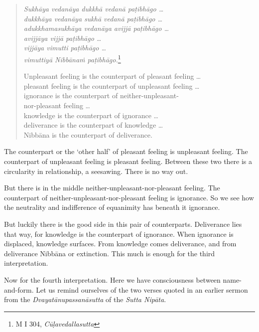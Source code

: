 \begin{quote}
\emph{Sukhāya vedanāya dukkhā vedanā paṭibhāgo \ldots{}}\\
\emph{dukkhāya vedanāya sukhā vedanā paṭibhāgo \ldots{}}\\
\emph{adukkhamasukhāya vedanāya avijjā paṭibhāgo \ldots{}}\\
\emph{avijjāya vijjā paṭibhāgo \ldots{}}\\
\emph{vijjāya vimutti paṭibhāgo \ldots{}}\\
\emph{vimuttiyā Nibbānaṁ paṭibhāgo.}\footnote{M I 304, \emph{Cūḷavedallasutta}}

Unpleasant feeling is the counterpart of pleasant feeling \ldots{}\\
pleasant feeling is the counterpart of unpleasant feeling \ldots{}\\
ignorance is the counterpart of neither-unpleasant-\\ nor-pleasant feeling \ldots{}\\
knowledge is the counterpart of ignorance \ldots{}\\
deliverance is the counterpart of knowledge \ldots{}\\
Nibbāna is the counterpart of deliverance.
\end{quote}

The counterpart or the `other half' of pleasant feeling is unpleasant feeling. The counterpart of unpleasant feeling is pleasant feeling. Between these two there is a circularity in relationship, a seesawing. There is no way out.

But there is in the middle neither-unpleasant-nor-pleasant feeling. The counterpart of neither-unpleasant-nor-pleasant feeling is ignorance. So we see how the neutrality and indifference of equanimity has beneath it ignorance.

But luckily there is the good side in this pair of counterparts. Deliverance lies that way, for knowledge is the counterpart of ignorance. When ignorance is displaced, knowledge surfaces. From knowledge comes deliverance, and from deliverance Nibbāna or extinction. This much is enough for the third interpretation.

Now for the fourth interpretation. Here we have consciousness between name-and-form. Let us remind ourselves of the two verses quoted in an earlier sermon from the \emph{Dvayatānupassanāsutta} of the \emph{Sutta Nipāta}.

